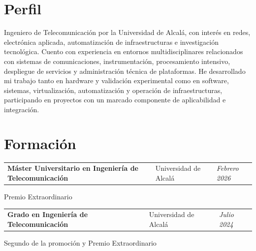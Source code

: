 \section{Perfil}
\begin{onecolentry}
Ingeniero de Telecomunicación por la Universidad de Alcalá, con interés en redes, electrónica aplicada, automatización de infraestructuras e investigación tecnológica. Cuento con experiencia en entornos multidisciplinares relacionados con sistemas de comunicaciones, instrumentación, procesamiento intensivo, despliegue de servicios y administración técnica de plataformas. He desarrollado mi trabajo tanto en hardware y validación experimental como en software, sistemas, virtualización, automatización y operación de infraestructuras, participando en proyectos con un marcado componente de aplicabilidad e integración.
\end{onecolentry}

\vspace{-5pt}

\section{Formación}

\begin{onecolentry}
	\begin{tabularx}{\textwidth}{@{}>{\raggedright\arraybackslash}X>{\raggedright\arraybackslash}p{3.6cm}>{\raggedleft\arraybackslash}p{2.4cm}@{}}
		\textbf{Máster Universitario en Ingeniería de Telecomunicación} & Universidad de Alcalá & \textit{Febrero 2026}
	\end{tabularx}
	
	\vspace{0.05 cm}
	\hspace{0.2cm}Premio Extraordinario
\end{onecolentry}

\vspace{0.2 cm}

\begin{onecolentry}
	\begin{tabularx}{\textwidth}{@{}>{\raggedright\arraybackslash}X>{\raggedright\arraybackslash}p{3.6cm}>{\raggedleft\arraybackslash}p{2.4cm}@{}}
		\textbf{Grado en Ingeniería de Telecomunicación} & Universidad de Alcalá & \textit{Julio 2024}
	\end{tabularx}
	
	\vspace{0.05 cm}
	\hspace{0.2cm}Segundo de la promoción y Premio Extraordinario
\end{onecolentry}


